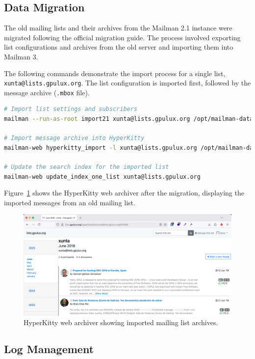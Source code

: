 \subsection*{Data Migration}

The old mailing lists and their archives from the Mailman 2.1 instance were migrated following the official migration guide\cite{mailman3-migration}. The process involved exporting list configurations and archives from the old server and importing them into Mailman 3.

The following commands demonstrate the import process for a single list, \texttt{xunta@lists.gpulux.org}. The list configuration is imported first, followed by the message archive (\texttt{.mbox} file).

\begin{lstlisting}[language=bash,caption={Commands to migrate a Mailman 2.1 list to Mailman 3.}]
# Import list settings and subscribers
mailman --run-as-root import21 xunta@lists.gpulux.org /opt/mailman-data/config.pck

# Import message archive into HyperKitty
mailman-web hyperkitty_import -l xunta@lists.gpulux.org /opt/mailman-data/xunta.mbox

# Update the search index for the imported list
mailman-web update_index_one_list xunta@lists.gpulux.org
\end{lstlisting}

Figure~\ref{fig:mailman-ui} shows the HyperKitty web archiver after the migration, displaying the imported messages from an old mailing list.

\begin{figure}[h!]
	\centering
	\includegraphics[width=\textwidth]{imaxes/hyperkitty-ui.png}
	\caption{HyperKitty web archiver showing imported mailing list archives.}
	\label{fig:mailman-ui}
\end{figure}

\subsection*{Log Management}

